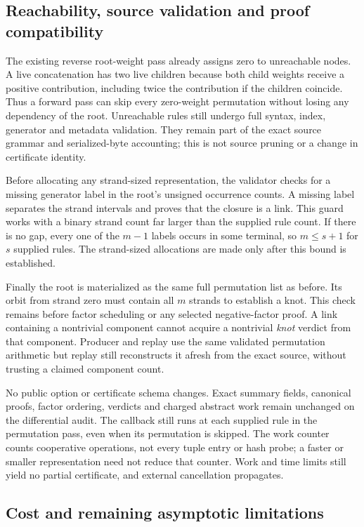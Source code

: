 \subsection{Reachability, source validation and proof compatibility}

The existing reverse root-weight pass already assigns zero to unreachable
nodes. A live concatenation has two live children because both child weights
receive a positive contribution, including twice the contribution if the
children coincide. Thus a forward pass can skip every zero-weight permutation
without losing any dependency of the root. Unreachable rules still undergo
full syntax, index, generator and metadata validation. They remain part of
the exact source grammar and serialized-byte accounting; this is not source
pruning or a change in certificate identity.

Before allocating any strand-sized representation, the validator checks for
a missing generator label in the root's unsigned occurrence counts. A missing
label separates the strand intervals and proves that the closure is a link.
This guard works with a binary strand count far larger than the supplied
rule count. If there is no gap, every one of the $m-1$ labels occurs in some
terminal, so $m\le s+1$ for $s$ supplied rules. The strand-sized allocations
are made only after this bound is established.

Finally the root is materialized as the same full permutation list as before.
Its orbit from strand zero must contain all $m$ strands to establish a knot.
This check remains before factor scheduling or any selected negative-factor
proof. A link containing a nontrivial component cannot acquire a nontrivial
\emph{knot} verdict from that component. Producer and replay use the same
validated permutation arithmetic but replay still reconstructs it afresh
from the exact source, without trusting a claimed component count.

No public option or certificate schema changes. Exact summary fields,
canonical proofs, factor ordering, verdicts and charged abstract work remain
unchanged on the differential audit. The callback still runs at each supplied
rule in the permutation pass, even when its permutation is skipped. The work
counter counts cooperative operations, not every tuple entry or hash probe;
a faster or smaller representation need not reduce that counter. Work and
time limits still yield no partial certificate, and external cancellation
propagates.

\subsection{Cost and remaining asymptotic limitations}

